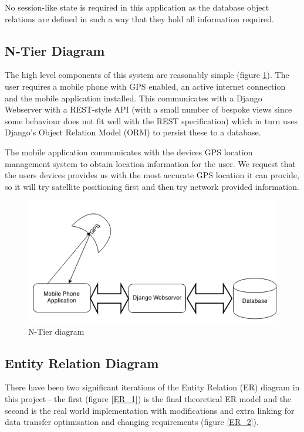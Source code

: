 No session-like state is required in this application as the database
object relations are defined in such a way that they hold all
information required. 

\subsection{N-Tier Diagram}
The high level components of this system are reasonably simple (figure
\ref{NTier}). The
user requires a mobile phone with GPS enabled, an active internet
connection and the mobile application installed. This communicates
with a Django Webserver with a REST-style API (with a small number of
bespoke views since some behaviour does not fit well with the REST
specification) which in turn uses Django's Object Relation Model (ORM)
to persist these to a database.

The mobile application communicates with the devices GPS location
management system to obtain location information for the
user. We request that the users devices provides us with the most
accurate GPS location it can provide, so it will try satellite
positioning first and then try network provided information.
\begin{figure}[H]
  \centering
  \includegraphics[width=\textwidth]{images/N-tier.png}
  \caption{N-Tier diagram}
  \label{NTier}
\end{figure}

\subsection{Entity Relation Diagram}
\label{sec:ER}
There have been two significant iterations of the Entity Relation (ER)
diagram in this project - the first (figure \ref{ER_1}) is the final
theoretical ER model and the second is the real world implementation
with modifications and extra linking for data transfer optimisation
and changing requirements (figure \ref{ER_2}).

